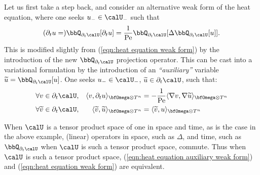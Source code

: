     Let us first take a step back, and consider an alternative weak form of the heat equation, where one seeks $u_{-}  \in  \calU_{-}$ such that
    \begin{equation}\label{eqn:heat equation auxiliary weak form}
        (\partial_{t}u  =)  \bbQ_{\partial_{t}\calU}[\partial_{t}u]  =  \frac{1}{\rmPe}\bbQ_{\partial_{t}\calU}[\Delta\bbQ_{\partial_{t}\calU}[u]].
    \end{equation}
    This is modified slightly from (\ref{eqn:heat equation weak form}) by the introduction of the new $\bbQ_{\partial_{t}\calU}$ projection operator. This can be cast into a variational formulation by the introduction of an \emph{``auxiliary''} variable $\widetilde{u}  =  \bbQ_{\partial_{t}\calU}[u]$. One seeks $u_{-}  \in  \calU_{-}$, $\widetilde{u}  \in  \partial_{t}\calU$, such that:
    \begin{align}
        &\forall  v              \in  \partial_{t}\calU,  &              \langle v, \partial_{t}u\rangle_{\bfOmega\otimes T^{n}}  &=   - \frac{1}{\rmPe}\langle\nabla v, \nabla\widetilde{u}\rangle_{\bfOmega\otimes T^{n}}  \label{eqn:heat equation auxiliary variational form 1}  \\
        &\forall  \widetilde{v}  \in  \partial_{t}\calU,  &  \langle \widetilde{v}, \widetilde{u}\rangle_{\bfOmega\otimes T^{n}}  &=   \langle\widetilde{v}, u\rangle_{\bfOmega\otimes T^{n}}  \label{eqn:heat equation auxiliary variational form 2}
    \end{align}
    
    When $\calU$ is a tensor product space of one in space and time, as is the case in the above example, (linear) operators in space, such as $\Delta$, and time, such as $\bbQ_{\partial_{t}\calU}$ when $\calU$ is such a tensor product space, commute. Thus when $\calU$ is such a tensor product space, (\ref{eqn:heat equation auxiliary weak form}) and (\ref{eqn:heat equation weak form}) are equivalent.

